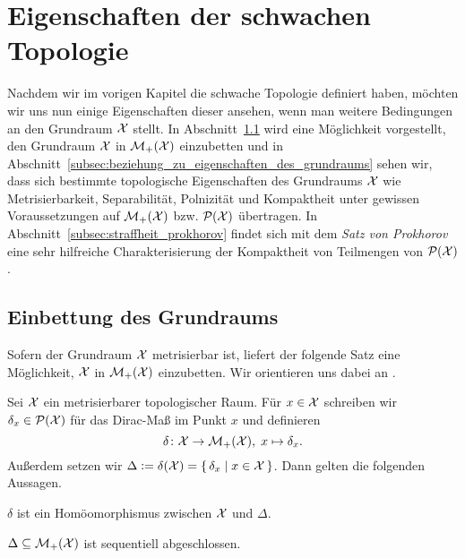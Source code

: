 \documentclass[../thesis/thesis.tex]{subfiles}
\begin{document}
	
	\chapter{Eigenschaften der schwachen Topologie}
	\label{chap:eigenschaften_der_schwachen_topologie}
	
	Nachdem wir im vorigen Kapitel die schwache Topologie definiert haben, möchten wir uns nun einige Eigenschaften dieser ansehen, wenn man weitere Bedingungen an den Grundraum $\mathcal{X}$ stellt. 
	In Abschnitt~\ref{subsec:einbettung_des_grundraums} wird eine Möglichkeit vorgestellt, den Grundraum $\mathcal{X}$ in $\mathcal{M}_{+}(\mathcal{X})$ einzubetten und in Abschnitt~\ref{subsec:beziehung_zu_eigenschaften_des_grundraums} sehen wir, dass sich bestimmte topologische Eigenschaften des Grundraums $\mathcal{X}$ wie 
	Metrisierbarkeit, Separabilität, Polnizität und Kompaktheit unter gewissen Voraussetzungen auf $\mathcal{M}_{+}(\mathcal{X})$ bzw. $\mathcal{P}(\mathcal{X})$ übertragen.
	In Abschnitt~\ref{subsec:straffheit_prokhorov} findet sich mit dem \emph{Satz von Prokhorov} eine sehr hilfreiche Charakterisierung der Kompaktheit von Teilmengen von $\mathcal{P}(\mathcal{X})$.
	
	\section{Einbettung des Grundraums}
	\label{subsec:einbettung_des_grundraums}
	
	Sofern der Grundraum $\mathcal{X}$ metrisierbar ist, liefert der folgende Satz eine Möglichkeit, $\mathcal{X}$ in $\mathcal{M}_{+}(\mathcal{X})$ einzubetten. 
	Wir orientieren uns dabei an \cite[Lemma 3.2 und 3.3]{Varadarajan.1958}.
	
	\begin{Satz}
		\label{satz:einbettung_des_grundraums}
		Sei $\mathcal{X}$ ein metrisierbarer topologischer Raum. Für $x \in \mathcal{X}$ schreiben wir $\delta_x \in \mathcal{P}(\mathcal{X})$ für das Dirac-Maß im Punkt $x$ und definieren
		\[ \delta \colon \mathcal{X} \to \mathcal{M}_{+}(\mathcal{X}), \; x \mapsto \delta_x  \text{.} \]
		Außerdem setzen wir $\Delta \vcentcolon = \delta(\mathcal{X}) = \left\{\, \delta_x \; \middle| \; x \in \mathcal{X} \,\right\}$. Dann gelten die folgenden Aussagen.
		\begin{enumeratethm}
			\item $\delta$ ist ein Homöomorphismus zwischen $\mathcal{X}$ und $\Delta$.
			\item $\Delta \subseteq \mathcal{M}_{+}(\mathcal{X})$ ist sequentiell abgeschlossen.
		\end{enumeratethm}
	\end{Satz}
\end{document}
